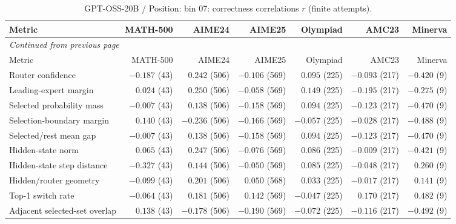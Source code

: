 \begingroup\scriptsize\setlength{\tabcolsep}{4pt}
\begin{longtable}{@{}lrrrrrr@{}}
\caption{GPT-OSS-20B / Position: bin 07: correctness correlations $r$ (finite attempts).}\label{tab:multi-gptoss-position-bin_07}\\
\toprule
Metric & MATH-500 & AIME24 & AIME25 & Olympiad & AMC23 & Minerva \\
\midrule\endfirsthead
\multicolumn{7}{l}{\textit{Continued from previous page}}\\
\toprule
Metric & MATH-500 & AIME24 & AIME25 & Olympiad & AMC23 & Minerva \\
\midrule\endhead
\bottomrule\endfoot
Router confidence & $-0.187$ (43) & $0.242$ (506) & $-0.106$ (569) & $0.095$ (225) & $-0.093$ (217) & $-0.420$ (9) \\
Leading-expert margin & $0.024$ (43) & $0.250$ (506) & $-0.058$ (569) & $0.149$ (225) & $-0.195$ (217) & $-0.275$ (9) \\
Selected probability mass & $-0.007$ (43) & $0.138$ (506) & $-0.158$ (569) & $0.094$ (225) & $-0.123$ (217) & $-0.470$ (9) \\
Selection-boundary margin & $0.140$ (43) & $-0.236$ (506) & $-0.166$ (569) & $-0.057$ (225) & $-0.028$ (217) & $-0.488$ (9) \\
Selected/rest mean gap & $-0.007$ (43) & $0.138$ (506) & $-0.158$ (569) & $0.094$ (225) & $-0.123$ (217) & $-0.470$ (9) \\
Hidden-state norm & $0.065$ (43) & $0.247$ (506) & $-0.076$ (569) & $0.086$ (225) & $-0.009$ (217) & $-0.421$ (9) \\
Hidden-state step distance & $-0.327$ (43) & $0.144$ (506) & $-0.050$ (569) & $0.085$ (225) & $-0.048$ (217) & $0.260$ (9) \\
Hidden/router geometry & $-0.099$ (43) & $0.201$ (506) & $0.050$ (568) & $0.033$ (225) & $-0.017$ (217) & $0.141$ (9) \\
Top-1 switch rate & $-0.064$ (43) & $0.181$ (506) & $0.142$ (569) & $-0.047$ (225) & $0.170$ (217) & $0.482$ (9) \\
Adjacent selected-set overlap & $0.138$ (43) & $-0.178$ (506) & $-0.190$ (569) & $-0.072$ (225) & $-0.116$ (217) & $-0.492$ (9) \\
\end{longtable}\endgroup

